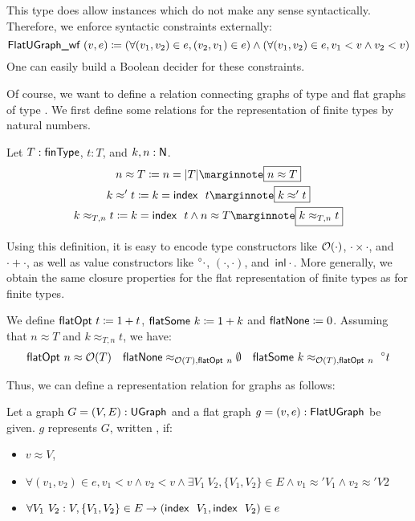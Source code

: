 This type does allow instances which do not make any sense syntactically. Therefore, we enforce syntactic constraints externally:
\[\textsf{FlatUGraph\_wf}~(v, e) \coloneqq (\forall (v_1, v_2) \in e, (v_2, v_1) \in e) \land (\forall (v_1, v_2) \in e, v_1 < v \land v_2 < v) \]
One can easily build a Boolean decider for these constraints. 

Of course, we want to define a relation connecting graphs of type \UGraph{} and flat graphs of type \FlatUGraph{}. We first define some relations for the representation of finite types by natural numbers. 

\begin{definition}
  Let $T : \textsf{finType}$, $t : T$, and $k, n : \mathsf{N}$. 
  \begin{gather*}
    n \approx T \defeq n = \length{T} \mnote{$n \approx T$}\\
    k \approx' t \defeq k = \findex~t \mnote{$k \approx' t$}\\
    k \approx_{T, n} t \defeq k = \findex~t \land n \approx T \mnote{$k \approx_{T, n} t$}
  \end{gather*}
\end{definition}

Using this definition, it is easy to encode type constructors like $\mathcal{O}{(\cdot)}$, $\cdot \times \cdot$, and $\cdot + \cdot$, as well as value constructors like $\prescript{\circ}{}\cdot$, $( \cdot, \cdot)$, and $\textsf{inl}~\cdot$. More generally, we obtain the same closure properties for the flat representation of finite types as for finite types.

\begin{example}
  We define $\textsf{flatOpt}~t \coloneqq 1 +{t}$, $\textsf{flatSome}~k \coloneqq 1 +{k}$ and $\textsf{flatNone} \coloneqq 0$. 
  Assuming that $n \approx T$ and $k \approx_{T, n} t$, we have:
  \begin{align*}
  \textsf{flatOpt}~n \approx \mathcal{O}{(T)} \quad \textsf{flatNone} \approx_{\mathcal{O}{(T)}, \textsf{flatOpt}~n} \emptyset \quad \textsf{flatSome}~k \approx_{\mathcal{O}{(T)}, \textsf{flatOpt}~n}~\prescript{\circ}{}t \end{align*}
\end{example}

Thus, we can define a representation relation for graphs as follows: 
\begin{definition}
  Let a graph $G = (V, E) : \textsf{UGraph}$ and a flat graph $g = (v, e) : \textsf{FlatUGraph}$ be given. 
  $g$ represents $G$, written , if: 
  \begin{itemize}
    \item $v \approx V$, 
    \item $\forall (v_1, v_2) \in e, v_1 < v \land v_2 < v \land \exists V_1~V_2, \{V_1, V_2\} \in E \land v_1 \approx' V_1 \land v_2 \approx' V2$
    \item $\forall V_1~V_2 : V, \{V_1, V_2\} \in E \rightarrow (\textsf{index}~~V_1, \textsf{index}~~V_2) \in e$
  \end{itemize}
\end{definition}

